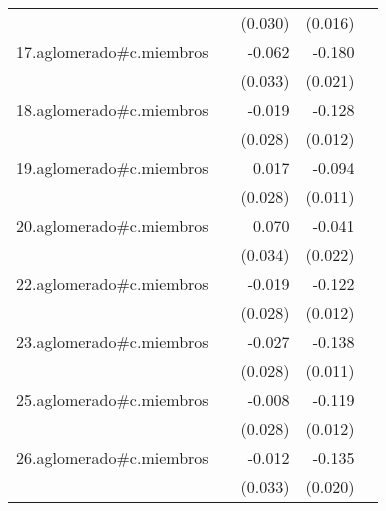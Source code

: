{\begin{longtable}{l*{4}{D{.}{.}{-1}}}
            &                     &     (0.030)         &     (0.016)         &                     \\
\addlinespace
17.aglomerado#c.miembros&                     &      -0.062         &      -0.180\sym{***}&                     \\
            &                     &     (0.033)         &     (0.021)         &                     \\
\addlinespace
18.aglomerado#c.miembros&                     &      -0.019         &      -0.128\sym{***}&                     \\
            &                     &     (0.028)         &     (0.012)         &                     \\
\addlinespace
19.aglomerado#c.miembros&                     &       0.017         &      -0.094\sym{***}&                     \\
            &                     &     (0.028)         &     (0.011)         &                     \\
\addlinespace
20.aglomerado#c.miembros&                     &       0.070\sym{*}  &      -0.041         &                     \\
            &                     &     (0.034)         &     (0.022)         &                     \\
\addlinespace
22.aglomerado#c.miembros&                     &      -0.019         &      -0.122\sym{***}&                     \\
            &                     &     (0.028)         &     (0.012)         &                     \\
\addlinespace
23.aglomerado#c.miembros&                     &      -0.027         &      -0.138\sym{***}&                     \\
            &                     &     (0.028)         &     (0.011)         &                     \\
\addlinespace
25.aglomerado#c.miembros&                     &      -0.008         &      -0.119\sym{***}&                     \\
            &                     &     (0.028)         &     (0.012)         &                     \\
\addlinespace
26.aglomerado#c.miembros&                     &      -0.012         &      -0.135\sym{***}&                     \\
            &                     &     (0.033)         &     (0.020)         &                     \\

\end{longtable}}
